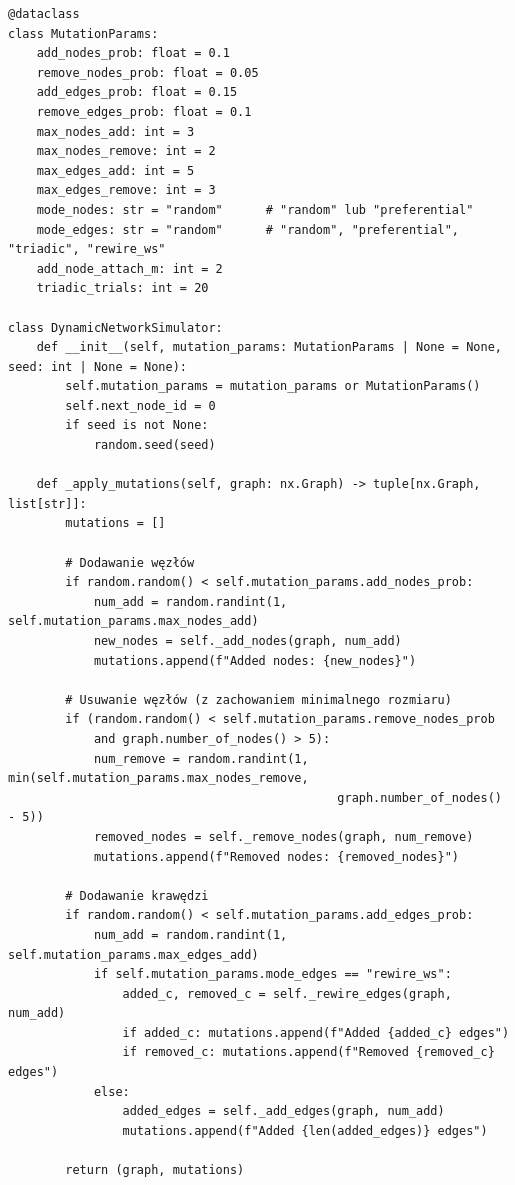     {\footnotesize
        \begin{verbatim}
@dataclass
class MutationParams:
    add_nodes_prob: float = 0.1
    remove_nodes_prob: float = 0.05
    add_edges_prob: float = 0.15
    remove_edges_prob: float = 0.1
    max_nodes_add: int = 3
    max_nodes_remove: int = 2
    max_edges_add: int = 5
    max_edges_remove: int = 3
    mode_nodes: str = "random"      # "random" lub "preferential"
    mode_edges: str = "random"      # "random", "preferential", "triadic", "rewire_ws"
    add_node_attach_m: int = 2
    triadic_trials: int = 20

class DynamicNetworkSimulator:
    def __init__(self, mutation_params: MutationParams | None = None, seed: int | None = None):
        self.mutation_params = mutation_params or MutationParams()
        self.next_node_id = 0
        if seed is not None:
            random.seed(seed)

    def _apply_mutations(self, graph: nx.Graph) -> tuple[nx.Graph, list[str]]:
        mutations = []

        # Dodawanie węzłów
        if random.random() < self.mutation_params.add_nodes_prob:
            num_add = random.randint(1, self.mutation_params.max_nodes_add)
            new_nodes = self._add_nodes(graph, num_add)
            mutations.append(f"Added nodes: {new_nodes}")

        # Usuwanie węzłów (z zachowaniem minimalnego rozmiaru)
        if (random.random() < self.mutation_params.remove_nodes_prob
            and graph.number_of_nodes() > 5):
            num_remove = random.randint(1, min(self.mutation_params.max_nodes_remove,
                                              graph.number_of_nodes() - 5))
            removed_nodes = self._remove_nodes(graph, num_remove)
            mutations.append(f"Removed nodes: {removed_nodes}")

        # Dodawanie krawędzi
        if random.random() < self.mutation_params.add_edges_prob:
            num_add = random.randint(1, self.mutation_params.max_edges_add)
            if self.mutation_params.mode_edges == "rewire_ws":
                added_c, removed_c = self._rewire_edges(graph, num_add)
                if added_c: mutations.append(f"Added {added_c} edges")
                if removed_c: mutations.append(f"Removed {removed_c} edges")
            else:
                added_edges = self._add_edges(graph, num_add)
                mutations.append(f"Added {len(added_edges)} edges")

        return (graph, mutations)


\end{verbatim}}
